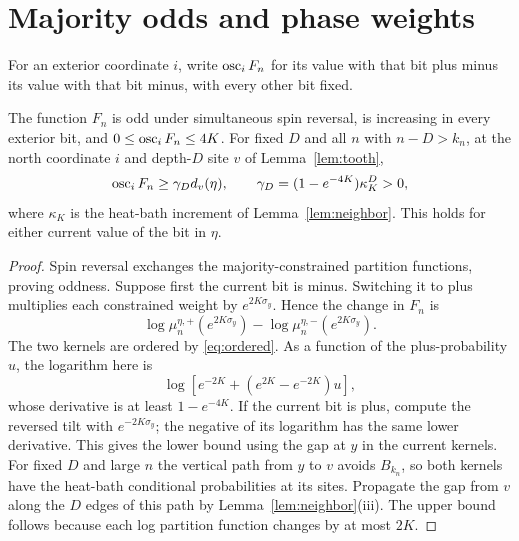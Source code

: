 \section{Majority odds and phase weights}\label{sec:odds}
For an exterior coordinate $i$, write $\operatorname{osc}_iF_n$ for its value with that bit plus minus its value with that bit minus, with every other bit fixed.

\begin{lemma}\label{lem:response}
The function $F_n$ is odd under simultaneous spin reversal, is increasing in every exterior bit, and $0\le\operatorname{osc}_iF_n\le4K$. For fixed $D$ and all $n$ with $n-D>k_n$, at the north coordinate $i$ and depth-$D$ site $v$ of Lemma~\ref{lem:tooth},
\begin{equation}\label{eq:response}
 \operatorname{osc}_iF_n\ge \gamma_D d_v(\eta),\qquad
 \gamma_D=(1-e^{-4K})\kappa_K^D>0,
\end{equation}
where $\kappa_K$ is the heat-bath increment of Lemma~\ref{lem:neighbor}. This holds for either current value of the bit in $\eta$.
\end{lemma}
\begin{proof}
Spin reversal exchanges the majority-constrained partition functions, proving oddness. Suppose first the current bit is minus. Switching it to plus multiplies each constrained weight by $e^{2K\sigma_y}$. Hence the change in $F_n$ is
\[
 \log\mu_n^{\eta,+}(e^{2K\sigma_y})
 -\log\mu_n^{\eta,-}(e^{2K\sigma_y}).
\]
The two kernels are ordered by \eqref{eq:ordered}. As a function of the plus-probability $u$, the logarithm here is
\[
 \log[e^{-2K}+(e^{2K}-e^{-2K})u],
\]
whose derivative is at least $1-e^{-4K}$. If the current bit is plus, compute the reversed tilt with $e^{-2K\sigma_y}$; the negative of its logarithm has the same lower derivative. This gives the lower bound using the gap at $y$ in the current kernels. For fixed $D$ and large $n$ the vertical path from $y$ to $v$ avoids $B_{k_n}$, so both kernels have the heat-bath conditional probabilities at its sites. Propagate the gap from $v$ along the $D$ edges of this path by Lemma~\ref{lem:neighbor}(iii). The upper bound follows because each log partition function changes by at most $2K$.
\end{proof}

